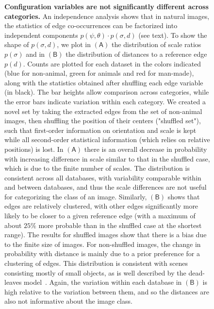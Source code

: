 \documentclass[a4paper]{article}
\newcounter{num}
\newcommand{\hide}[1]{}
\begin{document}
\begin{figure}[!htb]
\centering{

}
\caption{ 
{\bf Configuration variables are not significantly different across categories.}  
An independence analysis shows that in natural images,
the statistics of edge co-occurrences can be factorized into 
independent components $p(\psi,\theta)\cdot p(\sigma,d)$ (see text). 
To show the shape of $p(\sigma,d)$, we plot in 
$\mathsf{(A)}$ the distribution of scale ratios $p(\sigma)$ and in 
$\mathsf{(B)}$ the distribution of distances to a reference edge $p(d)$. 
Counts are plotted for each dataset in the colors indicated 
(blue for non-animal, green for animals and red for man-made), 
along with the statistics obtained after shuffling each edge variable (in black). 
The bar heights allow comparison across categories, 
while the error bars indicate variation within each category. 
  We created a novel set by taking the extracted edges from the set of
  non-animal images, then shuffling the position of their centers
  ("shuffled set"), such that first-order information on orientation
  and scale is kept while all second-order statistical information
  (which relies on relative positions) is lost.
In $\mathsf{(A)}$ there is an overall decrease in probability 
with increasing difference in scale similar to that in the shuffled case, 
which is due to the finite number of scales. 
The distribution is consistent across all databases, 
with variability comparable within and  between databases, 
and thus the scale differences are not useful for categorizing the class of an image. 
Similarly, $\mathsf{(B)}$ shows that edges are relatively clustered, 
with other edges significantly more likely to be closer to a given reference edge 
(with a maximum of about $25\%$ more probable than in the shuffled case at the shortest range).
The results for shuffled images show that there is a bias due to the finite size of images. 
For non-shuffled images, the change in probability with distance is mainly due 
to a prior preference for a clustering of edges. 
This distribution is consistent with scenes consisting mostly of small objects, 
as is well described by the dead-leaves model~\autocite{Pitkow10}. 
Again, the variation within each database in $\mathsf{(B)}$ 
is high relative to the variation between them, and
so the distances are also not informative about the image class. 
\hide{
$\mathsf{(C)}$ 
A second component $p(\theta, \psi)$ 
represents the distribution of the different geometrical arrangements of edges' angles, 
which we call a ``chevron map'' (see main text Figure~2 and its description). 
}}
\end{figure}
\end{document}
